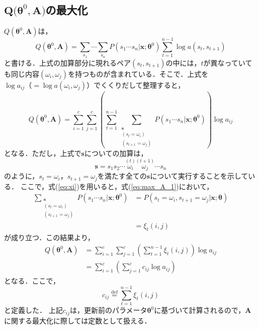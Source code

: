 \documentclass[a4j]{jarticle}
\begin{document}
\subsection*{$\bm{Q(\theta}^{0}, \bm{A)}$の最大化}
$Q(\bm{\theta}^{0}, \bm{A})$は，
\begin{equation}
Q(\bm{\theta}^{0}, \bm{A}) = \sum_{s_{1}} \cdots \sum_{s_{n}} P(s_{1} \cdots s_{n} | \mathbf{x}; \bm{\theta}^{0}) \sum_{t=1}^{n-1} \log a(s_{t}, s_{t+1})
\end{equation}
と書ける．上式の加算部分に現れるペア$(s_{t}, s_{t+1})$の中には，$t$が異なっていても同じ内容$(\omega_{i}, \omega_{j})$を持つものが含まれている．そこで．上式を$\log a_{ij}（=\log a(\omega_{i}, \omega_{j})）$でくくりだして整理すると，
\begin{equation}
Q(\bm{\theta}^{0}, \bm{A}) = \sum_{i=1}^{c} \sum_{j=1}^{c} \left( \sum_{t=1}^{n-1} \sum_{\substack{\mathbf{s} \\ (s_{t} = \omega_{i}) \\ (s_{t+1} = \omega_{j})}} P(s_{1} \cdots s_{n} | \mathbf{x}; \bm{\theta}^{0}) \right) \log a_{ij} \label{eq:max_A_1}
\end{equation}
となる．ただし，上式で$\mathbf{s}$についての加算は，
\begin{equation}
\mathbf{s} = s_{1} s_{2} \cdots \overset{(t)}{\omega_{i}} \overset{(t+1)}{\omega_{j}} \cdots s_{n}
\end{equation}
のように，$s_{t}=\omega_{i}$，$s_{t+1} = \omega_{j}$を満たす全ての$\mathbf{s}$について実行することを示している．
ここで，式(\ref{eq:xi})を用いると，式(\ref{eq:max_A_1})において，
\begin{align}
\sum_{\substack{\mathbf{s} \\ (s_{t} = \omega_{i}) \\ (s_{t+1} = \omega_{j})}} P(s_{1} \cdots s_{n} | \mathbf{x}; \bm{\theta}^{0}) & = P(s_{t} = \omega_{i}, s_{t+1} = \omega_{j} | \mathbf{x}; \bm{\theta}) \\
& = \xi_{t}(i, j)
\end{align}
が成り立つ．この結果より，
\begin{align}
Q(\bm{\theta}^{0}, \bm{A}) & = \sum_{i=1}^{c} \sum_{j=1}^{c} \left( \sum_{t=1}^{n-1} \xi_{t} (i, j) \right) \log a_{ij} \\
& = \sum_{i=1}^{c} \left( \sum_{j=1}^{c} c_{ij} \log a_{ij} \right) \label{eq:max_A_2}
\end{align}
となる．ここで，
\begin{equation}
c_{ij} \overset{\mathrm{def}}{=} \sum_{t=1}^{n-1} \xi_{t} (i, j)
\end{equation}
と定義した．
上記$c_{ij}$は，更新前のパラメータ$\bm{\theta}^{0}$に基づいて計算されるので，$\bm{A}$に関する最大化に際しては定数として扱える．
\end{document}

